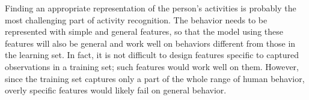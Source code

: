 



Finding an appropriate representation of the person's activities is probably the most challenging part of activity recognition. The behavior needs to be represented with simple and general features, so that the model using these features will also be general and work well on behaviors different from those in the learning set. 
In fact, it is not difficult to design features specific to captured observations in a training set; such features would work well on them. However, since the training set captures only a part of the whole range of human behavior, overly specific features would likely fail on general behavior.

